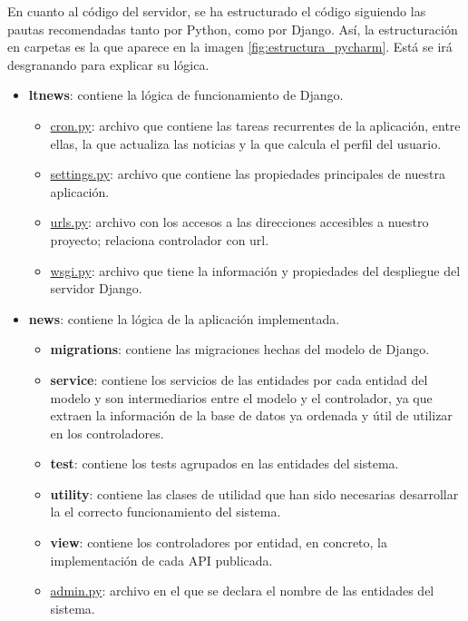 En cuanto al código del servidor, se ha estructurado el código siguiendo las pautas recomendadas tanto por Python, como por Django. Así, la estructuración en carpetas es la que aparece en la imagen \ref{fig:estructura_pycharm}. Está se irá desgranando para explicar su lógica.


\begin{itemize}
    \item \textbf{ltnews}: contiene la lógica de funcionamiento de Django.
    \begin{itemize}
        \item \underline{cron.py}: archivo que contiene las tareas recurrentes de la aplicación, entre ellas, la que actualiza las noticias y la que calcula el perfil del usuario.
        \item \underline{settings.py}: archivo que contiene las propiedades principales de nuestra aplicación.
        \item \underline{urls.py}: archivo con los accesos a las direcciones accesibles a nuestro proyecto; relaciona controlador con url.
        \item \underline{wsgi.py}: archivo que tiene la información y propiedades del despliegue del servidor Django.
    \end{itemize}
    \item \textbf{news}: contiene la lógica de la aplicación implementada.
    \begin{itemize}
        \item \textbf{migrations}: contiene las migraciones hechas del modelo de Django.
        \item \textbf{service}: contiene los servicios de las entidades por cada entidad del modelo y son intermediarios entre el modelo y el controlador, ya que extraen la información de la base de datos ya ordenada y útil de utilizar en los controladores.
        \item \textbf{test}: contiene los tests agrupados en las entidades del sistema.
        \item \textbf{utility}: contiene las clases de utilidad que han sido necesarias desarrollar la el correcto funcionamiento del sistema.
        \item \textbf{view}: contiene los controladores por entidad, en concreto, la implementación de cada API publicada.
        \item \underline{admin.py}: archivo en el que se declara el nombre de las entidades del sistema.

\end{itemize}
\end{itemize}
